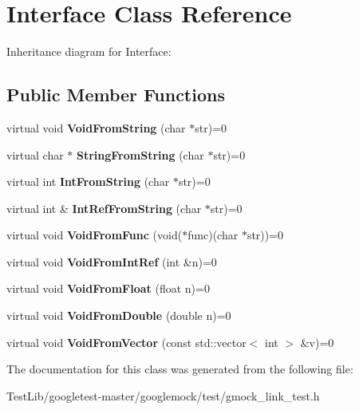 \hypertarget{classInterface}{}\section{Interface Class Reference}
\label{classInterface}


Inheritance diagram for Interface\+:
\subsection*{Public Member Functions}
\begin{DoxyCompactItemize}
\item 
\mbox{\label{classInterface_a65d6ae604e7e9a513aec72c9c94e0b97}} 
virtual void {\bfseries Void\+From\+String} (char $\ast$str)=0
\item 
\mbox{\label{classInterface_a756b1d22c12aa3f14a5083f90043fbf0}} 
virtual char $\ast$ {\bfseries String\+From\+String} (char $\ast$str)=0
\item 
\mbox{\label{classInterface_ab34c8a5fd2236a6b009f86a4e5851b61}} 
virtual int {\bfseries Int\+From\+String} (char $\ast$str)=0
\item 
\mbox{\label{classInterface_ab93276de67e60c44fd775d4c139aa8e1}} 
virtual int \& {\bfseries Int\+Ref\+From\+String} (char $\ast$str)=0
\item 
\mbox{\label{classInterface_a7dab3c82b857a9a5f52b3ce6f7df547f}} 
virtual void {\bfseries Void\+From\+Func} (void($\ast$func)(char $\ast$str))=0
\item 
\mbox{\label{classInterface_aa43fb56650a57b6b3e7743e54e50cb86}} 
virtual void {\bfseries Void\+From\+Int\+Ref} (int \&n)=0
\item 
\mbox{\label{classInterface_ae2b3e9411c893a45642d3af632752c66}} 
virtual void {\bfseries Void\+From\+Float} (float n)=0
\item 
\mbox{\label{classInterface_aa56524017aabdbe46510648c711ab8a8}} 
virtual void {\bfseries Void\+From\+Double} (double n)=0
\item 
\mbox{\label{classInterface_ae84fe7e53f881db2f823ad35d004927a}} 
virtual void {\bfseries Void\+From\+Vector} (const std\+::vector$<$ int $>$ \&v)=0
\end{DoxyCompactItemize}


The documentation for this class was generated from the following file\+:\begin{DoxyCompactItemize}
\item 
Test\+Lib/googletest-\/master/googlemock/test/gmock\+\_\+link\+\_\+test.\+h\end{DoxyCompactItemize}
